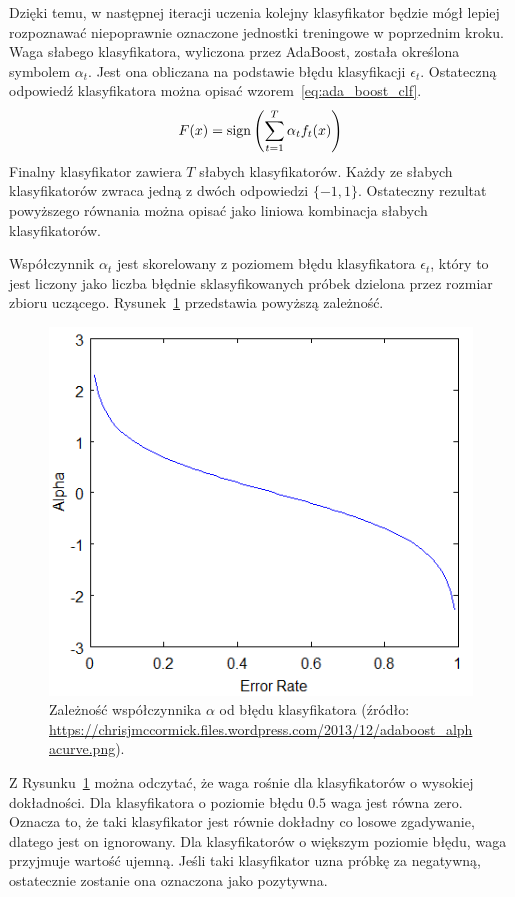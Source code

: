 Dzięki temu, w następnej iteracji uczenia kolejny klasyfikator będzie mógł lepiej rozpoznawać niepoprawnie oznaczone jednostki treningowe w poprzednim kroku.
Waga słabego klasyfikatora, wyliczona przez AdaBoost, została określona symbolem $\alpha_t$.
Jest ona obliczana na podstawie błędu klasyfikacji $\epsilon_t$.
Ostateczną odpowiedź klasyfikatora można opisać wzorem~\eqref{eq:ada_boost_clf}.
\begin{equation}
    \label{eq:ada_boost_clf}
    F(x) = \operatorname{sign}\left(\sum_{t=1}^{T} \alpha_t f_t(x)\right)
\end{equation}
Finalny klasyfikator zawiera $T$ słabych klasyfikatorów.
Każdy ze słabych klasyfikatorów zwraca jedną z dwóch odpowiedzi $\{-1, 1\}$.
Ostateczny rezultat powyższego równania można opisać jako liniowa kombinacja słabych klasyfikatorów.

Współczynnik $\alpha_t$ jest skorelowany z poziomem błędu klasyfikatora $\epsilon_t$, który to jest liczony jako liczba błędnie sklasyfikowanych próbek dzielona przez rozmiar zbioru uczącego.
Rysunek~\ref{fig:adaboost_alphacurve} przedstawia powyższą zależność.
\begin{figure}[!ht]
    \centering
    \includegraphics[scale=0.6]{Pictures/adaboost_alphacurve}
    \caption{Zależność współczynnika $\alpha$ od błędu klasyfikatora (źródło: \url{https://chrisjmccormick.files.wordpress.com/2013/12/adaboost_alphacurve.png}).}
    \label{fig:adaboost_alphacurve}
\end{figure}
\FloatBarrier
Z Rysunku~\ref{fig:adaboost_alphacurve} można odczytać, że waga rośnie dla klasyfikatorów o wysokiej dokładności.
Dla klasyfikatora o poziomie błędu $0.5$ waga jest równa zero.
Oznacza to, że taki klasyfikator jest równie dokładny co losowe zgadywanie, dlatego jest on ignorowany.
Dla klasyfikatorów o większym poziomie błędu, waga przyjmuje wartość ujemną.
Jeśli taki klasyfikator uzna próbkę za negatywną, ostatecznie zostanie ona oznaczona jako pozytywna.


